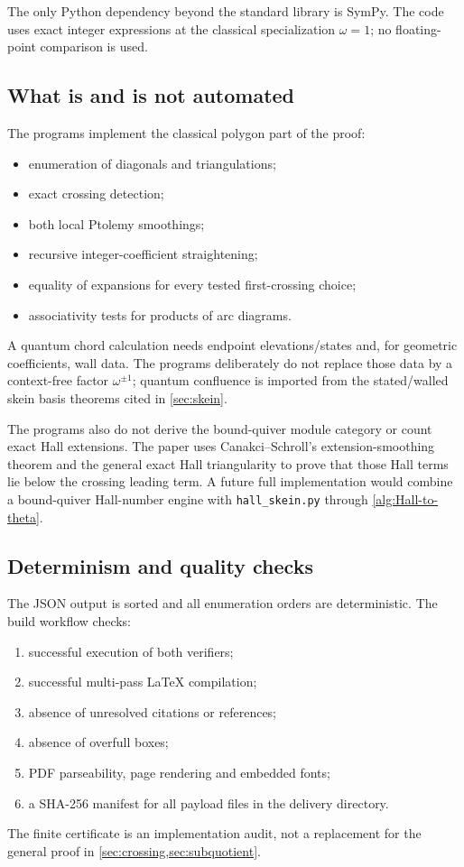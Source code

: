 The only Python dependency beyond the standard library is SymPy.  The code
uses exact integer expressions at the classical specialization $\omega=1$;
no floating-point comparison is used.

\subsection{What is and is not automated}

The programs implement the classical polygon part of the proof:
\begin{itemize}[leftmargin=2.3em]
\item enumeration of diagonals and triangulations;
\item exact crossing detection;
\item both local Ptolemy smoothings;
\item recursive integer-coefficient straightening;
\item equality of expansions for every tested first-crossing choice;
\item associativity tests for products of arc diagrams.
\end{itemize}

A quantum chord calculation needs endpoint elevations/states and, for
geometric coefficients, wall data.  The programs deliberately do not replace
those data by a context-free factor $\omega^{\pm1}$; quantum confluence is
imported from the stated/walled skein basis theorems cited in
\cref{sec:skein}.

The programs also do not derive the bound-quiver module category or count
exact Hall extensions.  The paper uses Canakci--Schroll's extension-smoothing
theorem and the general exact Hall triangularity to prove that those Hall
terms lie below the crossing leading term.  A future full implementation would
combine a bound-quiver Hall-number engine with \texttt{hall\_skein.py} through
\cref{alg:Hall-to-theta}.

\subsection{Determinism and quality checks}

The JSON output is sorted and all enumeration orders are deterministic.  The
build workflow checks:
\begin{enumerate}[label=(\roman*),leftmargin=2.3em]
\item successful execution of both verifiers;
\item successful multi-pass LaTeX compilation;
\item absence of unresolved citations or references;
\item absence of overfull boxes;
\item PDF parseability, page rendering and embedded fonts;
\item a SHA-256 manifest for all payload files in the delivery directory.
\end{enumerate}

The finite certificate is an implementation audit, not a replacement for the
general proof in \cref{sec:crossing,sec:subquotient}.
